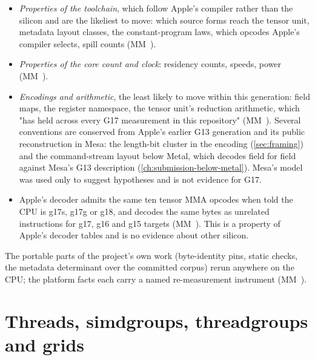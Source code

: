 \begin{itemize}
\item \emph{Properties of the toolchain}, which follow Apple's compiler rather than the silicon and are the likeliest to move:
  which source forms reach the tensor unit, metadata layout classes, the constant-program laws, which opcodes Apple's
  compiler selects, spill counts (MM~).
\item \emph{Properties of the core count and clock}: residency counts, speeds, power (MM~).
\item \emph{Encodings and arithmetic}, the least likely to move within this generation: field maps, the register namespace,
  the tensor unit's reduction arithmetic, which "has held across every G17 measurement in this repository" (MM~).
  Several conventions are conserved from Apple's earlier G13 generation and its public reconstruction in Mesa: the
  length-bit cluster in the encoding (\cref{sec:framing}) and the command-stream layout below Metal, which decodes field for
  field against Mesa's G13 description (\cref{ch:submission-below-metal}). Mesa's model was used only to suggest hypotheses and is not evidence for G17.
\item Apple's decoder admits the same ten tensor MMA opcodes when told the CPU is g17s, g17g or g18, and decodes the same
  bytes as unrelated instructions for g17, g16 and g15 targets (MM~). This is a property of Apple's decoder tables
  and is no evidence about other silicon.
\end{itemize}

The portable parts of the project's own work (byte-identity pins, static checks, the metadata determinant over the
committed corpus) rerun anywhere on the CPU; the platform facts each carry a named re-measurement instrument
(MM~).

\section{Threads, simdgroups, threadgroups and grids}\label{sec:threads-simdgroups-threadgroups}

